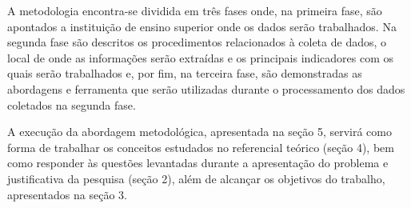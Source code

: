 A metodologia encontra-se dividida em três fases onde, na primeira fase, são apontados a instituição de ensino superior onde os dados serão trabalhados. Na segunda fase são descritos os procedimentos relacionados à coleta de dados, o local de onde as informações serão extraídas e os principais indicadores com os quais serão trabalhados e, por fim, na terceira fase, são demonstradas as abordagens e ferramenta que serão utilizadas durante o processamento dos dados coletados na segunda fase.

A execução da abordagem metodológica, apresentada na seção 5, servirá como forma de trabalhar os conceitos estudados no referencial teórico (seção 4), bem como responder às questões levantadas durante a apresentação do problema e justificativa da pesquisa (seção 2), além de alcançar os objetivos do trabalho, apresentados na seção 3.


